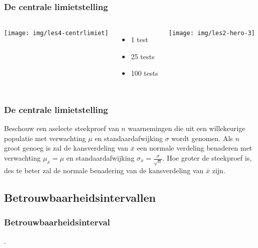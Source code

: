 \begin{frame}
	\frametitle{De centrale limietstelling}
	
	
	\vfill
	
	\begin{columns}[c]
		\texttt{[image: img/les4-centrlimiet]}
		\begin{itemize}
			\item 1 test
			\item 25 tests
			\item 100 tests
		\end{itemize}
		\texttt{[image: img/les2-hero-3]}
	\end{columns}
	
\end{frame}

\begin{frame}
	\frametitle{De centrale limietstelling}
	Beschouw een aselecte steekproef van $n$ waarnemingen die uit een willekeurige populatie met verwachting $\mu$ en standaardafwijking $\sigma$ wordt genomen. Als $n$ groot genoeg is zal de kansverdeling van $\overline{x}$ een normale verdeling benaderen met verwachting $\mu_{\overline{x}} = \mu$ en standaardafwijking $\sigma_{\overline{x}} = \frac{\sigma}{\sqrt{n}}$. Hoe groter de steekproef is, des te beter zal de normale benadering van de kansverdeling van $\overline{x}$ zijn.
\end{frame}

\subsection{Betrouwbaarheidsintervallen}
\begin{frame}
	\frametitle{Betrouwbaarheidsinterval}
	
	.
\end{frame}

